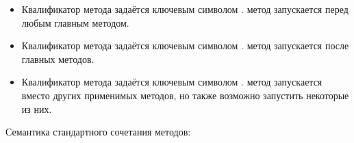 \begin{itemize}

\item 
Квалификатор  метода задаётся ключевым символом
.  метод запускается перед любым главным методом.

\item 
Квалификатор  метода задаётся ключевым символом
.  метод запускается после главных методов.

\item 
Квалификатор  метода задаётся ключевым символом
.  метод запускается вместо других применимых методов,
но также возможно запустить некоторые из них.
\end{itemize}

Семантика стандартного сочетания методов:

